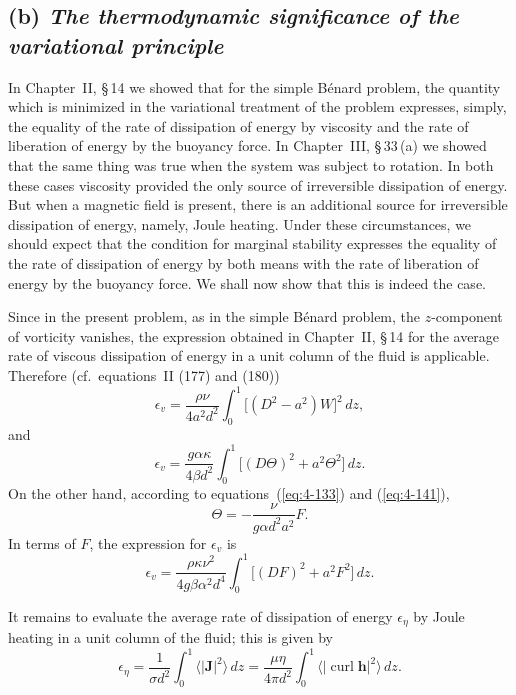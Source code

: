 \subsection*{(b) \emph{The thermodynamic significance of the variational principle}}

In Chapter~II, \S\,14 we showed that for the simple B\'enard problem, the quantity which is minimized in the variational treatment of the problem expresses, simply, the equality of the rate of dissipation of energy by viscosity and the rate of liberation of energy by the buoyancy force. In Chapter~III, \S\,33\,(a) we showed that the same thing was true when the system was subject to rotation. In both these cases viscosity provided the only source of irreversible dissipation of energy. But when a magnetic field is present, there is an additional source for irreversible dissipation of energy, namely, Joule heating. Under these circumstances, we should expect that the condition for marginal stability expresses the equality of the rate of dissipation of energy by both means with the rate of liberation of energy by the buoyancy force. We shall now show that this is indeed the case.

Since in the present problem, as in the simple B\'enard problem, the $z$-component of vorticity vanishes, the expression obtained in Chapter~II, \S\,14 for the average rate of viscous dissipation of energy in a unit column of the fluid is applicable. Therefore (cf.\ equations~II (177) and (180))
\begin{equation}
\label{eq:4-148}
\epsilon_v = \frac{\rho\nu}{4a^2 d^2}\int_0^1 \bigl[(D^2-a^2)W\bigr]^2\,dz,
\end{equation}
and
\begin{equation}
\label{eq:4-149}
\epsilon_v = \frac{g\alpha\kappa}{4\beta d^2}\int_0^1 \bigl[(D\Theta)^2+a^2\Theta^2\bigr]\,dz.
\end{equation}
On the other hand, according to equations~(\ref{eq:4-133}) and (\ref{eq:4-141}),
\begin{equation}
\label{eq:4-150}
\Theta = -\frac{\nu}{g\alpha d^2 a^2}F.
\end{equation}
In terms of $F$, the expression for $\epsilon_v$ is
\begin{equation}
\label{eq:4-151}
\epsilon_v = \frac{\rho\kappa\nu^2}{4g\beta\alpha^2 d^4}\int_0^1 \bigl[(DF)^2+a^2 F^2\bigr]\,dz.
\end{equation}

It remains to evaluate the average rate of dissipation of energy $\epsilon_\eta$ by Joule heating in a unit column of the fluid; this is given by
\begin{equation}
\label{eq:4-152}
\epsilon_\eta = \frac{1}{\sigma d^2}\int_0^1 \langle|\mathbf{J}|^2\rangle\,dz = \frac{\mu\eta}{4\pi d^2}\int_0^1 \langle|\operatorname{curl}\mathbf{h}|^2\rangle\,dz.
\end{equation}

